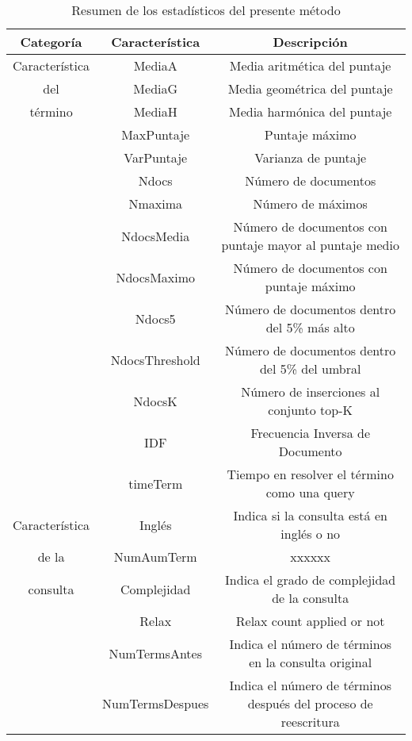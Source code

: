 \begin{table}[!th]
\caption{Resumen de los estadísticos del presente método}
\begin{tabular}{|c|c|c|}
\hline
\textbf{Categoría} & \textbf{Característica} & \textbf{Descripción} \\ \hline
\multicolumn{ 1}{|p{3cm}|}{Característica} & MediaA & Media aritmética del puntaje \\ \cline{ 2- 3}
\multicolumn{ 1}{|p{3cm}|}{del} & MediaG & Media geométrica del puntaje \\ \cline{ 2- 3}
\multicolumn{ 1}{|p{3cm}|}{término} & MediaH & Media harmónica del puntaje \\ \cline{ 2- 3}
\multicolumn{ 1}{|c|}{} & MaxPuntaje & Puntaje máximo \\ \cline{ 2- 3}
\multicolumn{ 1}{|c|}{} & VarPuntaje & Varianza de puntaje \\ \cline{ 2- 3}
\multicolumn{ 1}{|c|}{} & Ndocs & Número de documentos \\ \cline{ 2- 3}
\multicolumn{ 1}{|c|}{} & Nmaxima & Número de máximos \\ \cline{ 2- 3}
\multicolumn{ 1}{|c|}{} & NdocsMedia & Número de documentos con puntaje mayor al puntaje medio \\ \cline{ 2- 3}
\multicolumn{ 1}{|c|}{} & NdocsMaximo & Número de documentos con puntaje máximo \\ \cline{ 2- 3}
\multicolumn{ 1}{|c|}{} & Ndocs5 & Número de documentos dentro del 5\% más alto \\ \cline{ 2- 3}
\multicolumn{ 1}{|c|}{} & NdocsThreshold & Número de documentos dentro del 5\% del umbral \\ \cline{ 2- 3}
\multicolumn{ 1}{|c|}{} & NdocsK & Número de inserciones al conjunto top-K \\ \cline{ 2- 3}
\multicolumn{ 1}{|c|}{} & IDF & Frecuencia Inversa de Documento \\ \cline{ 2- 3}
\multicolumn{ 1}{|c|}{} & timeTerm & Tiempo en resolver el término como una query \\ \hline
\multicolumn{ 1}{|p{3cm}|}{Característica} & Inglés & Indica si la consulta está en inglés o no \\ \cline{ 2- 3}
\multicolumn{ 1}{|p{3cm}|}{de la} & NumAumTerm & xxxxxx \\ \cline{ 2- 3}
\multicolumn{ 1}{|p{3cm}|}{consulta} & Complejidad & Indica el grado de complejidad de la consulta \\ \cline{ 2- 3} 
\multicolumn{ 1}{|c|}{} & Relax & Relax count applied or not \\ \cline{ 2- 3} 
\multicolumn{ 1}{|c|}{} & NumTermsAntes & Indica el número de términos en la consulta original \\ \cline{ 2- 3} 
\multicolumn{ 1}{|c|}{} & NumTermsDespues & Indica el número de términos después del proceso de reescritura \\ \cline{ 2- 3} 
\hline

\end{tabular}
\label{tabla:estadisticosSigir}
\end{table}


